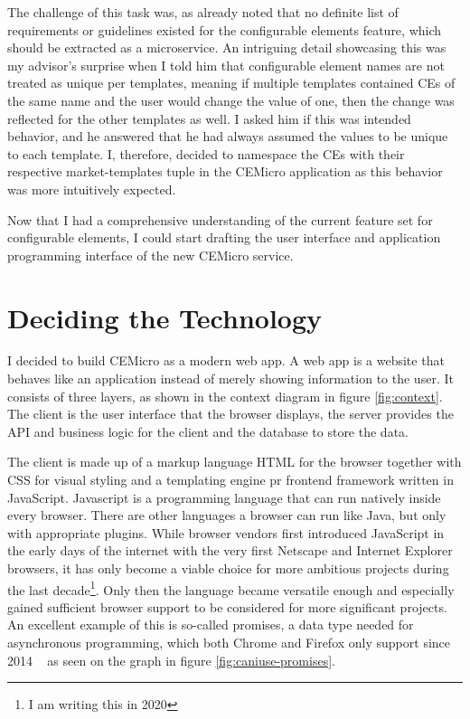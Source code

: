 The challenge of this task was, as already noted that no definite list of requirements or guidelines existed for the configurable elements feature, which should be extracted as a microservice. An intriguing detail showcasing this was my advisor's surprise when I told him that configurable element names are not treated as unique per templates, meaning if multiple templates contained CEs of the same name and the user would change the value of one, then the change was reflected for the other templates as well. I asked him if this was intended behavior, and he answered that he had always assumed the values to be unique to each template. I, therefore, decided to namespace the CEs with their respective market-templates tuple in the CEMicro application as this behavior was more intuitively expected.

Now that I had a comprehensive understanding of the current feature set for configurable elements, I could start drafting the user interface and application programming interface of the new CEMicro service.


\section{Deciding the Technology}
\label{sec:arch:technology}

I decided to build CEMicro as a modern web app. A web app is a website that behaves like an application instead of merely showing information to the user. It consists of three layers, as shown in the context diagram in figure \ref{fig:context}. The client is the user interface that the browser displays, the server provides the API and business logic for the client and the database to store the data.

The client is made up of a markup language HTML for the browser together with CSS for visual styling and a templating engine pr frontend framework written in JavaScript. Javascript is a programming language that can run natively inside every browser. There are other languages a browser can run like Java, but only with appropriate plugins. While browser vendors first introduced JavaScript in the early days of the internet with the very first Netscape and Internet Explorer browsers, it has only become a viable choice for more ambitious projects during the last decade\footnote{I am writing this in 2020}. Only then the language became versatile enough and especially gained sufficient browser support to be considered for more significant projects. An excellent example of this is so-called promises, a data type needed for asynchronous programming, which both Chrome and Firefox only support since 2014 ~\cite{caniuse.2020} as seen on the graph in figure \ref{fig:caniuse-promises}.

